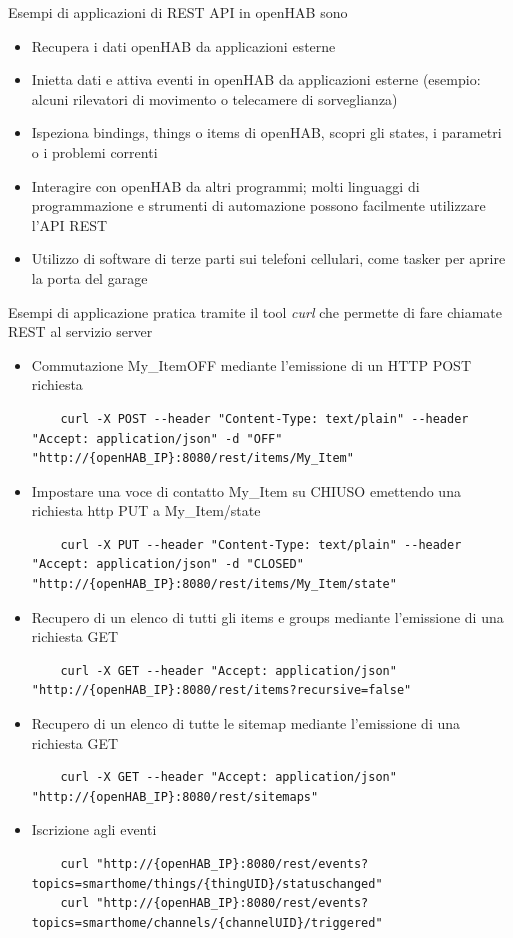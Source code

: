 Esempi di applicazioni di REST API in openHAB sono
\begin{itemize}
    \item Recupera i dati openHAB da applicazioni esterne
    \item Inietta dati e attiva eventi in openHAB da applicazioni esterne (esempio: alcuni rilevatori di movimento o telecamere di sorveglianza)
    \item Ispeziona bindings, things o items di openHAB, scopri gli states, i parametri o i problemi correnti
    \item Interagire con openHAB da altri programmi; molti linguaggi di programmazione e strumenti di automazione possono facilmente utilizzare l'API REST
    \item Utilizzo di software di terze parti sui telefoni cellulari, come tasker per aprire la porta del garage
\end{itemize}

Esempi di applicazione pratica tramite il tool {\em curl} che permette di fare chiamate REST al servizio server
\begin{itemize}
    \item Commutazione My\_ItemOFF mediante l'emissione di un HTTP POST richiesta
    \begin{lstlisting}
    curl -X POST --header "Content-Type: text/plain" --header "Accept: application/json" -d "OFF" "http://{openHAB_IP}:8080/rest/items/My_Item"
    \end{lstlisting}
    \item Impostare una voce di contatto My\_Item su CHIUSO emettendo una richiesta http PUT a My\_Item/state
    \begin{lstlisting}
    curl -X PUT --header "Content-Type: text/plain" --header "Accept: application/json" -d "CLOSED" "http://{openHAB_IP}:8080/rest/items/My_Item/state"
    \end{lstlisting}
    \item Recupero di un elenco di tutti gli items e groups mediante l'emissione di una richiesta GET
    \begin{lstlisting}
    curl -X GET --header "Accept: application/json" "http://{openHAB_IP}:8080/rest/items?recursive=false"
    \end{lstlisting}
    \item Recupero di un elenco di tutte le sitemap mediante l'emissione di una richiesta GET
    \begin{lstlisting}
    curl -X GET --header "Accept: application/json" "http://{openHAB_IP}:8080/rest/sitemaps"
    \end{lstlisting}
    \item Iscrizione agli eventi
    \begin{lstlisting}
    curl "http://{openHAB_IP}:8080/rest/events?topics=smarthome/things/{thingUID}/statuschanged"
    curl "http://{openHAB_IP}:8080/rest/events?topics=smarthome/channels/{channelUID}/triggered"
    \end{lstlisting}
\end{itemize}

